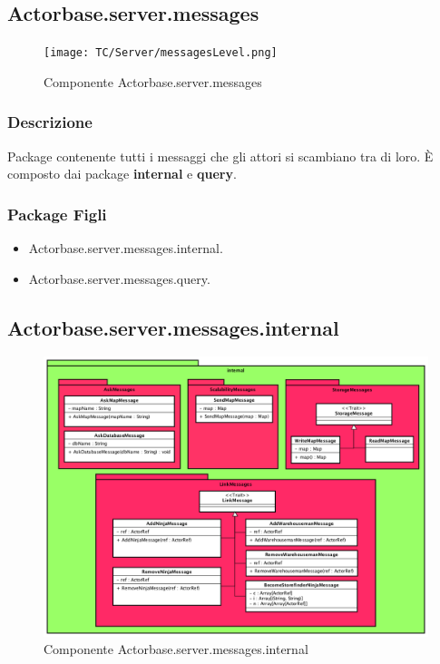 \documentclass[a4paper]{article}
\begin{document}
		\subsection{Actorbase.server.messages}
		
			\begin{figure}[H]
				\centering
				\texttt{[image: TC/Server/messagesLevel.png]}
				\caption{Componente Actorbase.server.messages}
			\end{figure}
			
			\subsubsection{Descrizione}
				Package contenente tutti i messaggi che gli attori si scambiano tra di loro.
				È composto dai package \textbf{internal} e \textbf{query}.
				
			\subsubsection{Package Figli}
				\begin{itemize}
					\item Actorbase.server.messages.internal.
					\item Actorbase.server.messages.query.
				\end{itemize}
				
		\subsection{Actorbase.server.messages.internal}
		
			\begin{figure} [H]
				\centering
				\includegraphics[scale=0.70]{ST/Server/internalLevel.png}
				\caption{Componente Actorbase.server.messages.internal}
			\end{figure}
			
\end{document}
